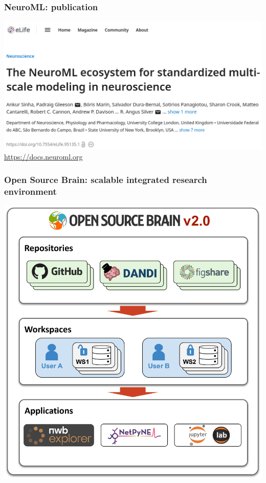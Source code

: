 \begin{frame}[c]
\begin{columns}
\begin{column}{0.5\textwidth}
\begin{figure}[h]
      \end{figure}%
    \end{column}
  \end{columns}
\end{frame}
\begin{frame}[c]
  \frametitle{NeuroML: publication}
  \begin{center}
    \includegraphics[keepaspectratio,width=\textwidth]{./99_images/20241018-neuroml-elife}\\\vspace{1ex}
    \url{https://docs.neuroml.org}
  \end{center}
\end{frame}
\begin{frame}[c]
  \frametitle{Open Source Brain: scalable integrated research environment}
  \begin{center}
\includegraphics[keepaspectratio,height=0.9\textheight]{./99_images/OSBv2Overview}
  \end{center}
\end{frame}
